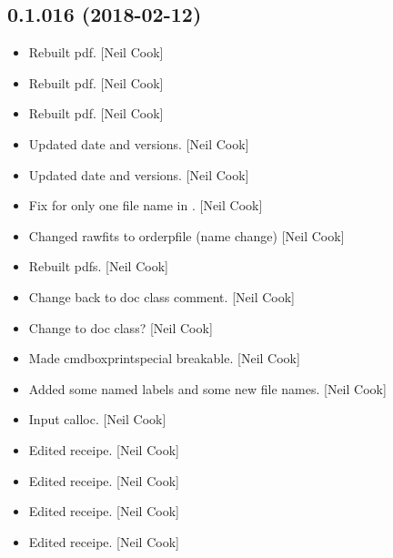\documentclass[a4paper,10pt,english]{report}
\begin{document}
\subsection{0.1.016 (2018-02-12)}
\label{\detokenize{misc/changelog:id488}}\begin{itemize}
\item {} 
Rebuilt pdf. {[}Neil Cook{]}

\item {} 
Rebuilt pdf. {[}Neil Cook{]}

\item {} 
Rebuilt pdf. {[}Neil Cook{]}

\item {} 
Updated date and versions. {[}Neil Cook{]}

\item {} 
Updated date and versions. {[}Neil Cook{]}

\item {} 
Fix for only one file name in . {[}Neil Cook{]}

\item {} 
Changed rawfits to orderpfile (name change) {[}Neil Cook{]}

\item {} 
Rebuilt pdfs. {[}Neil Cook{]}

\item {} 
Change back to doc class comment. {[}Neil Cook{]}

\item {} 
Change to doc class? {[}Neil Cook{]}

\item {} 
Made cmdboxprintspecial breakable. {[}Neil Cook{]}

\item {} 
Added some named labels and some new file names. {[}Neil Cook{]}

\item {} 
Input calloc. {[}Neil Cook{]}

\item {} 
Edited receipe. {[}Neil Cook{]}

\item {} 
Edited receipe. {[}Neil Cook{]}

\item {} 
Edited receipe. {[}Neil Cook{]}

\item {} 
Edited receipe. {[}Neil Cook{]}

\end{itemize}
\end{document}
